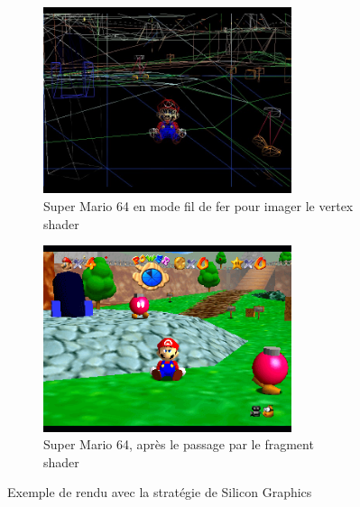     \begin{figure}[h]
        \begin{subfigure}{0.5\textwidth}
            \centering
            \includegraphics[width=0.8\textwidth]{images/m64wireframe.jpg}
            \caption{Super Mario 64 en mode fil de fer pour imager le \gls{vertex shader}}
            \label{fig:sm64_wireframe}
        \end{subfigure}
        \begin{subfigure}{0.5\textwidth}
            \centering
            \includegraphics[width=0.8\textwidth]{images/m64result.png}
            \caption{Super Mario 64, après le passage par le \gls{fragment shader}}
            \label{fig:sm64_result}
        \end{subfigure}
        \caption{Exemple de rendu avec la stratégie de Silicon Graphics \cite{copetti_n64}}
        \label{fig:silicon_graphics_rendering}
    \end{figure}

